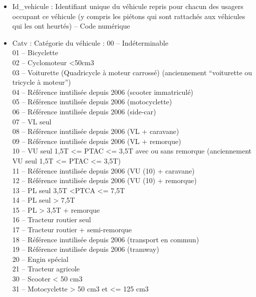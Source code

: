 \documentclass[french,]{tp}
\begin{document}
\begin{itemize}
  \begin{itemize}
  \item
    Id\_vehicule : Identifiant unique du véhicule repris pour chacun des usagers occupant ce véhicule (y compris les piétons qui sont rattachés aux véhicules qui les ont heurtés) -- Code numérique
  \item
    Catv : Catégorie du véhicule :
    00 -- Indéterminable\\
    01 -- Bicyclette\\
    02 -- Cyclomoteur \textless50cm3\\
    03 -- Voiturette (Quadricycle à moteur carrossé) (anciennement ``voiturette ou tricycle à moteur'')\\
    04 -- Référence inutilisée depuis 2006 (scooter immatriculé)\\
    05 -- Référence inutilisée depuis 2006 (motocyclette)\\
    06 -- Référence inutilisée depuis 2006 (side-car)\\
    07 -- VL seul\\
    08 -- Référence inutilisée depuis 2006 (VL + caravane)\\
    09 -- Référence inutilisée depuis 2006 (VL + remorque)\\
    10 -- VU seul 1,5T \textless= PTAC \textless= 3,5T avec ou sans remorque (anciennement VU seul 1,5T \textless= PTAC
    \textless= 3,5T)\\
    11 -- Référence inutilisée depuis 2006 (VU (10) + caravane)\\
    12 -- Référence inutilisée depuis 2006 (VU (10) + remorque)\\
    13 -- PL seul 3,5T \textless PTCA \textless= 7,5T\\
    14 -- PL seul \textgreater{} 7,5T\\
    15 -- PL \textgreater{} 3,5T + remorque\\
    16 -- Tracteur routier seul\\
    17 -- Tracteur routier + semi-remorque\\
    18 -- Référence inutilisée depuis 2006 (transport en commun)\\
    19 -- Référence inutilisée depuis 2006 (tramway)\\
    20 -- Engin spécial\\
    21 -- Tracteur agricole\\
    30 -- Scooter \textless{} 50 cm3\\
    31 -- Motocyclette \textgreater{} 50 cm3 et \textless= 125 cm3\\

\end{itemize}
\end{itemize}
\end{document}
